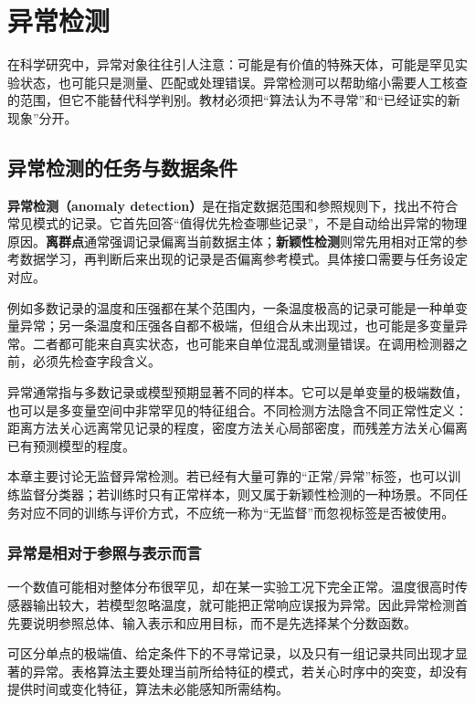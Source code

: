 \chapter{异常检测}

在科学研究中，异常对象往往引人注意：可能是有价值的特殊天体，可能是罕见实验状态，也可能只是测量、匹配或处理错误。异常检测可以帮助缩小需要人工核查的范围，但它不能替代科学判别。教材必须把“算法认为不寻常”和“已经证实的新现象”分开。
\section{异常检测的任务与数据条件}

\textbf{异常检测（anomaly detection）}是在指定数据范围和参照规则下，找出不符合常见模式的记录。它首先回答“值得优先检查哪些记录”，不是自动给出异常的物理原因。\textbf{离群点}通常强调记录偏离当前数据主体；\textbf{新颖性检测}则常先用相对正常的参考数据学习，再判断后来出现的记录是否偏离参考模式。具体接口需要与任务设定对应。

例如多数记录的温度和压强都在某个范围内，一条温度极高的记录可能是一种单变量异常；另一条温度和压强各自都不极端，但组合从未出现过，也可能是多变量异常。二者都可能来自真实状态，也可能来自单位混乱或测量错误。在调用检测器之前，必须先检查字段含义。

异常通常指与多数记录或模型预期显著不同的样本。它可以是单变量的极端数值，也可以是多变量空间中非常罕见的特征组合。不同检测方法隐含不同正常性定义：距离方法关心远离常见记录的程度，密度方法关心局部密度，而残差方法关心偏离已有预测模型的程度。

本章主要讨论无监督异常检测。若已经有大量可靠的“正常/异常”标签，也可以训练监督分类器；若训练时只有正常样本，则又属于新颖性检测的一种场景。不同任务对应不同的训练与评价方式，不应统一称为“无监督”而忽视标签是否被使用。

\subsection{异常是相对于参照与表示而言}
一个数值可能相对整体分布很罕见，却在某一实验工况下完全正常。温度很高时传感器输出较大，若模型忽略温度，就可能把正常响应误报为异常。因此异常检测首先要说明参照总体、输入表示和应用目标，而不是先选择某个分数函数。

可区分单点的极端值、给定条件下的不寻常记录，以及只有一组记录共同出现才显著的异常。表格算法主要处理当前所给特征的模式，若关心时序中的突变，却没有提供时间或变化特征，算法未必能感知所需结构。

